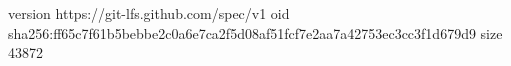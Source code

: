 version https://git-lfs.github.com/spec/v1
oid sha256:ff65c7f61b5bebbe2c0a6e7ca2f5d08af51fcf7e2aa7a42753ec3cc3f1d679d9
size 43872
